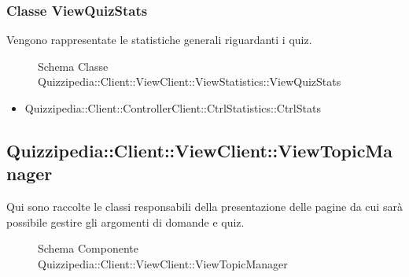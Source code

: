 \subsubsection{Classe ViewQuizStats}
Vengono rappresentate le statistiche generali riguardanti i quiz.
\begin{figure}[H]
\centering
\noindent{}
\caption{Schema Classe Quizzipedia::Client::ViewClient::ViewStatistics::ViewQuizStats}
\end{figure}
\begin{itemize}
\item Quizzipedia::Client::ControllerClient::CtrlStatistics::CtrlStats
\end{itemize}
\subsection{Quizzipedia::Client::ViewClient::ViewTopicManager}
Qui sono raccolte le classi responsabili della presentazione delle pagine da cui sarà possibile gestire gli argomenti di domande e quiz.
\begin{figure}[H]
\centering
\noindent{}
\caption[Quizzipedia::Client::ViewClient::ViewTopicManager]{Schema Componente Quizzipedia::Client::ViewClient::ViewTopicManager}
\end{figure}
